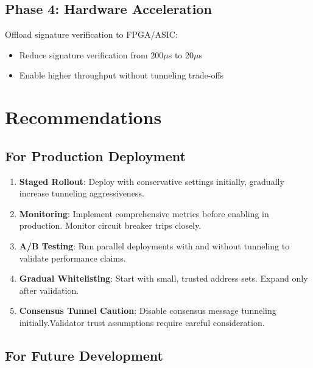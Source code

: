 \documentclass[11pt,a4paper]{article}
\begin{document}
\subsection{Phase 4: Hardware Acceleration}
Offload signature verification to FPGA/ASIC:
\begin{itemize}
    \item Reduce signature verification from 200$\mu$s to 20$\mu$s
    \item Enable higher throughput without tunneling trade-offs
\end{itemize}

\section{Recommendations}

\subsection{For Production Deployment}

\begin{enumerate}
    \item \textbf{Staged Rollout}: Deploy with conservative settings initially, gradually increase tunneling aggressiveness.
    
    \item \textbf{Monitoring}: Implement comprehensive metrics before enabling in production. Monitor circuit breaker trips closely.
    
    \item \textbf{A/B Testing}: Run parallel deployments with and without tunneling to validate performance claims.
    
    \item \textbf{Gradual Whitelisting}: Start with small, trusted address sets. Expand only after validation.
    
    \item \textbf{Consensus Tunnel Caution}: Disable consensus message tunneling initially.Validator trust assumptions require careful consideration.
\end{enumerate}

\subsection{For Future Development}
\end{document}
